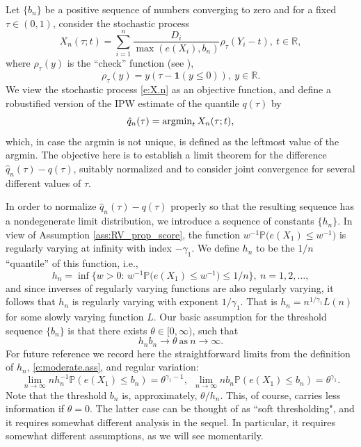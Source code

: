 \documentclass[12pt]{amsart}
\newcommand{\bbr}{\mathbb{R}}
\newcommand{\1}{\mathbbm{1}}
\newcommand{\0}{\mathbf{0}}
\newcommand{\one}{\mathbf{1}}
\theoremstyle{plain}
\theoremstyle{definition}
\newcommand{\bbP}{\mathbb{P}}
\begin{document}
  

Let $\{b_n\}$ be a positive sequence  of numbers converging to zero and for a fixed $\tau\in (0,1)$, consider the stochastic process  
\begin{equation} \label{e:X.n}
X_n(\tau;t) = \sum_{i=1}^n \frac{D_i}{\max(e(X_i),b_n)} \rho_\tau(Y_i-t),
 \ t\in\bbr,
\end{equation}
 where $\rho_\tau(y)$ is the ``check'' function (see \cite{koenker1982tests}),
\begin{equation*} \label{e:check.f}
  \rho_\tau(y)=y(\tau-\one(y\leq 0)), \ y\in\bbr.
\end{equation*}
We view the stochastic process \eqref{e:X.n} as an objective function, and define 
a robustified version of the IPW estimate of the quantile $q(\tau)$   by
\begin{equation} \label{e:argmin.n}
  \hat q_n(\tau) = {\rm argmin}_t \, X_n(\tau;t),
 \end{equation} 
which, in case the argmin is not unique, is defined as the leftmost value of the argmin. The objective here is to establish a limit theorem for the
difference $\hat q_n(\tau)-q(\tau)$, suitably normalized and to consider joint convergence for several different values of $\tau$.

In order to  normalize $\hat q_n(\tau)-q(\tau)$ properly so that the resulting sequence has a nondegenerate limit distribution, we introduce a  sequence of constants $\{h_n\}$.   In view of Assumption \ref{ass:RV_prop_score}, the function $w^{-1} \mathbb{P}\bigl( e(X_1)\leq w^{-1})$ is regularly varying at infinity with index $-\gamma_1$. We define $h_n$ to be the $1/n$ ``quantile'' of this function, i.e.,
%
\begin{equation} \label{e:h_n}
h_n=\inf\bigl\{ w>0:\, w^{-1} \bbP\bigl( e(X_1)\leq w^{-1})\leq
1/n\bigr\}, \ n=1,2,\ldots,
\end{equation}
%
and since inverses of regularly varying functions are also regularly varying, it follows that $h_n$ is regularly varying with exponent
$1/\gamma_1$. That is $h_n=n^{1/\gamma_1}L(n)$ for some slowly varying function $L$. Our basic assumption for the threshold sequence $\{b_n\}$ is that there exists 
$\theta\in [0,\infty)$, such that 
%
\begin{equation} \label{e:moderate.ass}
    h_nb_n\to \theta \ \text{as} \ n\to\infty.
  \end{equation}
  For future reference we record here the straightforward limits 
from the definition of $h_n$, \eqref{e:moderate.ass}, and 
regular variation:
%
\begin{equation} \label{e:key.lim}
  \lim_{n\to\infty} nh_n^{-1}\bbP(e(X_1)\leq b_n) =\theta^{\gamma_1-1}, \ \ 
  \lim_{n\to\infty} nb_n\bbP(e(X_1)\leq b_n) =\theta^{\gamma_1}.   
\end{equation}
%
Note that the threshold $b_n$ is, approximately, $\theta/h_n$. This, of course, carries less information if $\theta=0$. The latter case can be thought of as  ``soft thresholding", and it requires somewhat different analysis in the sequel. In particular, it requires somewhat different assumptions, as we will see momentarily. 
\end{document}
